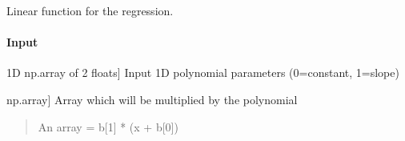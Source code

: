 \documentclass[letterpaper,10pt,english]{sphinxmanual}
\begin{document}
\begin{fulllineitems}
\label{\detokenize{api/pymusepipe:pymusepipe.util_image.my_linear_model}}
\pysigstartsignatures
{}
\pysigstopsignatures
\sphinxAtStartPar
Linear function for the regression.


\paragraph{Input}
\label{\detokenize{api/pymusepipe:id153}}\begin{description}
\sphinxlineitem{b}{[}1D np.array of 2 floats{]}
\sphinxAtStartPar
Input 1D polynomial parameters (0=constant, 1=slope)

\sphinxlineitem{x}{[}np.array{]}
\sphinxAtStartPar
Array which will be multiplied by the polynomial

\end{description}
\begin{quote}\begin{description}
\sphinxAtStartPar
An array = b{[}1{]} * (x + b{[}0{]})

\end{description}\end{quote}

\end{fulllineitems}

\end{document}
